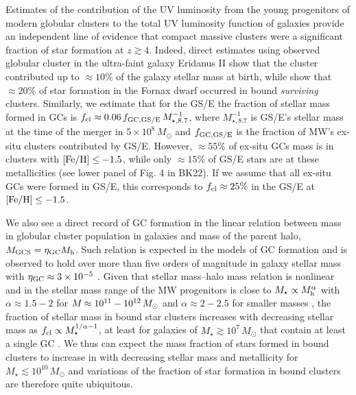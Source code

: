 \documentclass[a4paper,useAMS,usenatbib]{mnras}
\begin{document}
Estimates of the contribution of the UV luminosity from the young progenitors of modern globular clusters to the total UV luminosity function of galaxies \citep{Ricotti.2002,Boylan.Kolchin.2018} provide an 
independent line of evidence that compact massive clusters were a significant fraction of star formation at $z\gtrsim 4$. Indeed,
direct estimates using observed globular cluster in the ultra-faint galaxy Eridanus II \citep{Weisz.etal.2023} show that the cluster contributed up to $\approx 10\%$ of the galaxy stellar mass at birth, while \citet{Zick.etal.2018} show that $\approx 20\%$ of star formation in the Fornax dwarf occurred in bound {\it surviving} clusters. Similarly, 
we estimate that for the GS/E the fraction of stellar mass formed in GCs is $f_{\rm cl}\approx 0.06\,f_{\rm GC,GS/E}\,M^{-1}_{\star,8.7}$, where $M^{-1}_{\star,8.7}$ is GS/E's stellar mass at the time of the merger in $5\times 10^8\, M_\odot$ and $f_{\rm GC,GS/E}$ is the fraction of MW's ex-situ clusters contributed by GS/E. However, $\approx 55\%$ of ex-situ GCs mass is in clusters with $\rm [Fe/H]\leq -1.5$, while only $\approx 15\%$ of GS/E stars are at these metallicities (see lower panel of Fig. 4 in BK22). If we assume that all ex-situ GCs were formed in GS/E, this corresponds to $f_{\rm cl}\approx 25\%$ in the GS/E at $\rm [Fe/H]\leq -1.5$. 

We also see a direct record of GC formation in the linear relation between mass in globular cluster population in galaxies and mass of the parent halo, $M_{\rm GCS}=\eta_{\rm GC}M_{\rm h}$. Such relation is expected in the models of GC formation \citep{Kravtsov2005,Bekki.etal.2008, Choksi2018,Choksi2019,El_Badry_etal.2019} and is observed to hold over more than five orders of magnitude in galaxy stellar mass with $\eta_{\rm GC}\approx 3\times 10^{-5}$ \citep[see][]{Spitler.Forbes.2009,Hudson.etal.2014,Harris.etal.2017,Forbes.etal.2018,Dornan.Harris.2023}. Given that stellar mass--halo mass relation is nonlinear and in the stellar mass range of the MW progenitors is close to $M_\star\propto M_{\rm h}^\alpha$ with $\alpha\approx 1.5-2$ for $M_{\rm}\approx 10^{11}-10^{12}\, M_\odot$ and $\alpha\approx 2-2.5$ for smaller masses \citep[e.g.,][]{Kravtsov.etal.2018,Read.Erkal.2019,Nadler.etal.2020}, the fraction of stellar mass in bound star clusters increases with decreasing stellar mass as $f_{\rm cl}\propto M^{1/\alpha-1}_\star$, at least for galaxies of $M_\star\gtrsim 10^7\, M_\odot$ that contain at least a single GC \citep[e.g.,][]{Chen_Gnedin2023}. We thus can expect the mass fraction of stars formed in bound clusters to increase in with decreasing stellar mass and metallicity for $M_\star\lesssim 10^{10}\, M_\odot$ and variations of the fraction of star formation in bound clusters are therefore quite ubiquitous. 
 
\end{document}
